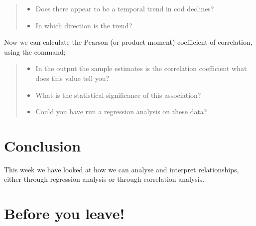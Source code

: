 \documentclass[
]{book}
\newenvironment{Shaded}{\begin{snugshade}}{\end{snugshade}}
\newcommand{\AttributeTok}[1]{\textcolor[rgb]{0.13,0.29,0.53}{#1}}
\newcommand{\CommentTok}[1]{\textcolor[rgb]{0.56,0.35,0.01}{\textit{#1}}}
\newcommand{\FunctionTok}[1]{\textcolor[rgb]{0.13,0.29,0.53}{\textbf{#1}}}
\newcommand{\NormalTok}[1]{#1}
\newcommand{\OtherTok}[1]{\textcolor[rgb]{0.56,0.35,0.01}{#1}}
\newcommand{\SpecialCharTok}[1]{\textcolor[rgb]{0.81,0.36,0.00}{\textbf{#1}}}
\newcommand{\StringTok}[1]{\textcolor[rgb]{0.31,0.60,0.02}{#1}}
\providecommand{\tightlist}{%
  \setlength{\itemsep}{0pt}\setlength{\parskip}{0pt}}
\begin{document}
\begin{quote}
\begin{itemize}
\tightlist
\item
  Does there appear to be a temporal trend in cod declines?
\item
  In which direction is the trend?
\end{itemize}
\end{quote}

Now we can calculate the Pearson (or product-moment) coefficient of correlation, using the command;

\begin{Shaded}
\end{Shaded}

\begin{quote}
\begin{itemize}
\tightlist
\item
  In the output the sample estimates is the correlation coefficient what does this value tell you?
\item
  What is the statistical significance of this association?
\item
  Could you have run a regression analysis on these data?
\end{itemize}
\end{quote}

\hypertarget{conclusion-3}{%
\section{Conclusion}\label{conclusion-3}}

This week we have looked at how we can analyse and interpret relationships, either through regression analysis or through correlation analysis.

\hypertarget{before-you-leave-5}{%
\section{Before you leave!}\label{before-you-leave-5}}
\end{document}
